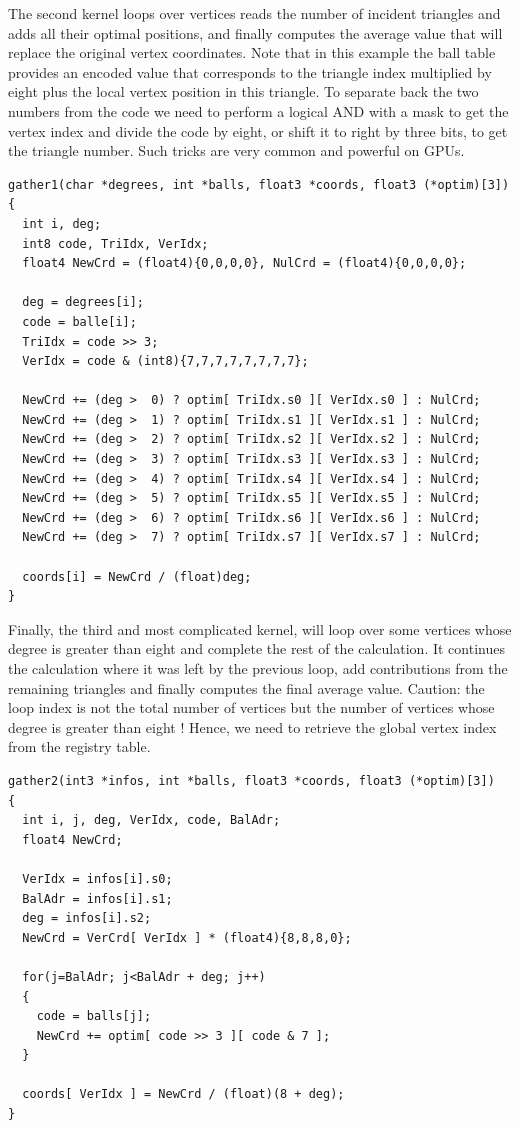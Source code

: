 \documentclass[a4paper,12pt]{article}
\begin{document}
The second kernel loops over vertices reads the number of incident triangles and adds all their optimal positions, and finally computes the average value that will replace the original vertex coordinates. Note that in this example the ball table provides an encoded value that corresponds to the triangle index multiplied by eight plus the local vertex position in this triangle. To separate back the two numbers from the code we need to perform a logical AND with a mask to get the vertex index and divide the code by eight, or shift it to right by three bits, to get the triangle number. Such tricks are very common and powerful on GPUs.

\begin{tt}
\begin{verbatim}
gather1(char *degrees, int *balls, float3 *coords, float3 (*optim)[3])
{
  int i, deg;
  int8 code, TriIdx, VerIdx;
  float4 NewCrd = (float4){0,0,0,0}, NulCrd = (float4){0,0,0,0};

  deg = degrees[i];
  code = balle[i];
  TriIdx = code >> 3;
  VerIdx = code & (int8){7,7,7,7,7,7,7,7};

  NewCrd += (deg >  0) ? optim[ TriIdx.s0 ][ VerIdx.s0 ] : NulCrd;
  NewCrd += (deg >  1) ? optim[ TriIdx.s1 ][ VerIdx.s1 ] : NulCrd;
  NewCrd += (deg >  2) ? optim[ TriIdx.s2 ][ VerIdx.s2 ] : NulCrd;
  NewCrd += (deg >  3) ? optim[ TriIdx.s3 ][ VerIdx.s3 ] : NulCrd;
  NewCrd += (deg >  4) ? optim[ TriIdx.s4 ][ VerIdx.s4 ] : NulCrd;
  NewCrd += (deg >  5) ? optim[ TriIdx.s5 ][ VerIdx.s5 ] : NulCrd;
  NewCrd += (deg >  6) ? optim[ TriIdx.s6 ][ VerIdx.s6 ] : NulCrd;
  NewCrd += (deg >  7) ? optim[ TriIdx.s7 ][ VerIdx.s7 ] : NulCrd;

  coords[i] = NewCrd / (float)deg;
}
\end{verbatim}
\end{tt}
\normalfont

Finally, the third and most complicated kernel, will loop over some vertices whose degree is greater than eight and complete the rest of the calculation. It continues the calculation where it was left by the previous loop, add contributions from the remaining triangles and finally computes the final average value. Caution: the loop index is not the total number of vertices but the number of vertices whose degree is greater than eight ! Hence, we need to retrieve the global vertex index from the registry table.

\begin{tt}
\begin{verbatim}
gather2(int3 *infos, int *balls, float3 *coords, float3 (*optim)[3])
{
  int i, j, deg, VerIdx, code, BalAdr;
  float4 NewCrd;

  VerIdx = infos[i].s0;
  BalAdr = infos[i].s1;
  deg = infos[i].s2;
  NewCrd = VerCrd[ VerIdx ] * (float4){8,8,8,0};

  for(j=BalAdr; j<BalAdr + deg; j++)
  {
    code = balls[j];
    NewCrd += optim[ code >> 3 ][ code & 7 ];
  }

  coords[ VerIdx ] = NewCrd / (float)(8 + deg);
}
\end{verbatim}
\end{tt}
\normalfont
\end{document}
